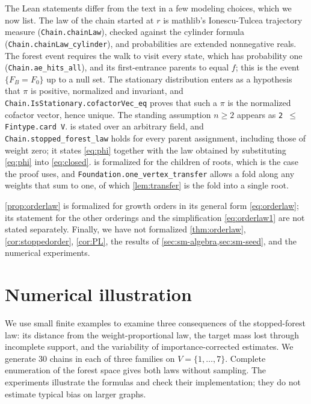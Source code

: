\documentclass[onefignum,onetabnum,nohypdvips]{siamart250211}
\numberwithin{theorem}{section}
\numberwithin{equation}{section}
\begin{document}
\begin{sloppypar}
The Lean statements differ from the text in a few
modeling choices, which we now list. The law of the chain started at $r$ is mathlib's Ionescu-Tulcea
trajectory measure (\texttt{Chain.chainLaw}), checked against the
cylinder formula (\texttt{Chain.chainLaw\_cylinder}), and probabilities
are extended nonnegative reals. The forest event requires the walk to
visit every state, which has probability one
(\texttt{Chain.ae\_hits\_all}), and its first-entrance parents to equal
$f$; this is the event $\{F_B=F_0\}$ up to a null set. The stationary
distribution enters as a hypothesis that $\pi$ is positive, normalized
and invariant, and \texttt{Chain.IsStationary.cofactorVec\_eq} proves
that such a $\pi$ is the normalized cofactor vector, hence unique. The
standing assumption $n\ge2$ appears as \texttt{2 \(\le\) Fintype.card V}.
 is stated over an arbitrary field, and
\texttt{Chain.stopped\_forest\_law} holds for every parent assignment,
including those of weight zero; it states \eqref{eq:phi} together with
the law obtained by substituting \eqref{eq:phi} into
\eqref{eq:closed}.  is formalized for
the children of roots, which is the case the proof uses, and
\texttt{Foundation.one\_vertex\_transfer} allows a fold along any
weights that sum to one, of which \cref{lem:transfer} is the fold into
a single root.
\end{sloppypar}

\cref{prop:orderlaw} is formalized for
growth orders in its general form \eqref{eq:orderlaw}; its statement for
the other orderings and the simplification \eqref{eq:orderlaw1} are not
stated separately. Finally, we have not formalized \cref{thm:orderlaw}, \cref{cor:stoppedorder},
\cref{cor:PL}, the results of
\cref{sec:sm-algebra,sec:sm-seed}, and the numerical
experiments.

\section{Numerical illustration}\label{sec:numerics}

We use small finite examples to examine three consequences of the
stopped-forest law: its distance from the weight-proportional law,
the target mass lost through incomplete support, and the variability
of importance-corrected estimates. We generate $30$ chains in each
of three families on $V=\{1,\dots,7\}$. Complete enumeration of the
forest space gives both laws without sampling. The experiments
illustrate the formulas and check their implementation; they do not
estimate typical bias on larger graphs.
\end{document}
